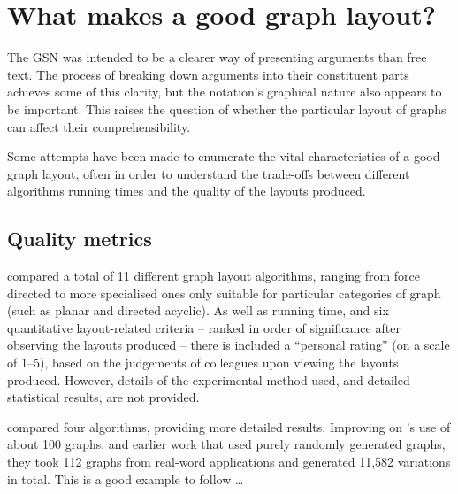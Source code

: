 \section{What makes a good graph layout?}

The GSN was intended to be a clearer way of presenting arguments than free text.
The process of breaking down arguments into their constituent parts achieves some of this clarity,
but the notation's graphical nature also appears to be important.
This raises the question of whether the particular layout of graphs can affect their comprehensibility.

Some attempts have been made to enumerate the vital characteristics of a good graph layout, often in order to understand the trade-offs between different algorithms running times and the quality of the layouts produced.


\subsection{Quality metrics}

\citet{Himsolt95comparingand} compared a total of 11 different graph layout algorithms, ranging from force directed to more specialised ones only suitable for particular categories of graph (such as planar and directed acyclic).
As well as running time, and six quantitative layout-related criteria -- ranked in order of significance after observing the layouts produced -- there is included a ``personal rating'' (on a scale of 1--5), based on the judgements of colleagues upon viewing the layouts produced.
However, details of the experimental method used, and detailed statistical results, are not provided.

\citet{DiBattista1997303} compared four algorithms, providing more detailed results.
Improving on \citeauthor{Himsolt95comparingand}'s use of about 100 graphs, and earlier work  that used purely randomly generated graphs, they took 112 graphs from real-word applications and generated 11,582 variations in total. This is a good example to follow \ldots

